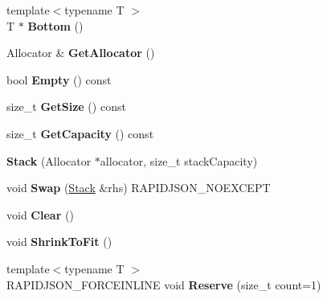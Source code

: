 \begin{DoxyCompactItemize}
\item 
\mbox{\label{classinternal_1_1Stack_a10aa1bc716b82cb0a40b3a3b9d5efe87}} 
{\footnotesize template$<$typename T $>$ }\\T $\ast$ {\bfseries Bottom} ()
\item 
\mbox{\label{classinternal_1_1Stack_ab01f693833dfe136f574d66547623cfa}} 
Allocator \& {\bfseries Get\+Allocator} ()
\item 
\mbox{\label{classinternal_1_1Stack_a2b8bda380e33838a99e3c73ff9785f03}} 
bool {\bfseries Empty} () const
\item 
\mbox{\label{classinternal_1_1Stack_ac484468a2791bd3e9ba609bd1600ab48}} 
size\+\_\+t {\bfseries Get\+Size} () const
\item 
\mbox{\label{classinternal_1_1Stack_a67d5d7ee9424d3dd46cf9d001b6cdc6b}} 
size\+\_\+t {\bfseries Get\+Capacity} () const
\item 
\mbox{\label{classinternal_1_1Stack_af09ab91f9e5143deccf7c9af837f451e}} 
{\bfseries Stack} (Allocator $\ast$allocator, size\+\_\+t stack\+Capacity)
\item 
\mbox{\label{classinternal_1_1Stack_a5e601199a21d84b1ac612f558be0f2c3}} 
void {\bfseries Swap} (\hyperlink{classinternal_1_1Stack}{Stack} \&rhs) R\+A\+P\+I\+D\+J\+S\+O\+N\+\_\+\+N\+O\+E\+X\+C\+E\+PT
\item 
\mbox{\label{classinternal_1_1Stack_a02da31665a372738e81ded2f7b7d598e}} 
void {\bfseries Clear} ()
\item 
\mbox{\label{classinternal_1_1Stack_a3852b8494d69c91f6a238a51572e591e}} 
void {\bfseries Shrink\+To\+Fit} ()
\item 
\mbox{\label{classinternal_1_1Stack_a7ae5de892834b7fc16099eb5e23dd97c}} 
{\footnotesize template$<$typename T $>$ }\\R\+A\+P\+I\+D\+J\+S\+O\+N\+\_\+\+F\+O\+R\+C\+E\+I\+N\+L\+I\+NE void {\bfseries Reserve} (size\+\_\+t count=1)

\end{DoxyCompactItemize}

